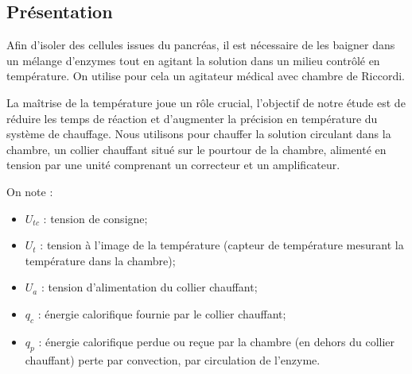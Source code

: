 \documentclass[10pt,fleqn]{article} %
\begin{document}

\vspace{5cm}
\pagestyle{fancy}
\thispagestyle{plain}

\def\columnseprulecolor{\color{ocre}}
\setlength{\columnseprule}{0.4pt} 

\def\pathfig{images}

\begin{multicols}{2}

\subsection*{Présentation}


Afin d'isoler des cellules issues du pancréas, il est nécessaire de les baigner dans un mélange d'enzymes tout en agitant la solution dans un milieu contrôlé en température. On utilise pour cela 
un agitateur médical avec chambre de Riccordi.


La maîtrise de la température joue un rôle crucial, l’objectif de notre étude est de réduire les temps
de réaction et d’augmenter la précision en température du système de chauffage.
Nous utilisons pour chauffer la solution circulant dans la chambre, un collier chauffant situé sur le
pourtour de la chambre, alimenté en tension par une unité comprenant un correcteur et un
amplificateur.




On note : 
\begin{itemize}
\item $U_{tc}$ : tension de consigne;
\item $U_t$ : tension à l'image de la température (capteur de température mesurant la température dans la chambre);
\item $U_a$ : tension d'alimentation du collier chauffant;
\item $q_c$ : énergie calorifique fournie par le collier chauffant;
\item $q_p$ : énergie calorifique perdue ou reçue par la chambre (en dehors du collier chauffant) perte par convection, par circulation de l'enzyme.
\end{itemize}


\end{multicols}
\end{document}
